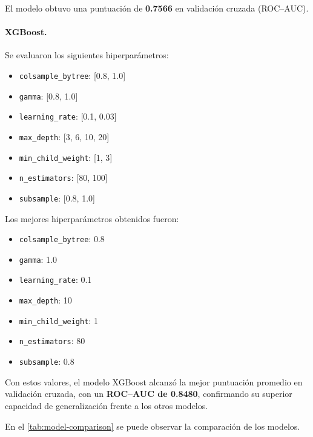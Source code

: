 \documentclass[12pt]{article}
\begin{document}
El modelo obtuvo una puntuación de \textbf{0.7566} en validación cruzada (ROC–AUC).

\paragraph{XGBoost.}
Se evaluaron los siguientes hiperparámetros:

\begin{itemize}
    \item \texttt{colsample\_bytree}: [0.8, 1.0]
    \item \texttt{gamma}: [0.8, 1.0]
    \item \texttt{learning\_rate}: [0.1, 0.03]
    \item \texttt{max\_depth}: [3, 6, 10, 20]
    \item \texttt{min\_child\_weight}: [1, 3]
    \item \texttt{n\_estimators}: [80, 100]
    \item \texttt{subsample}: [0.8, 1.0]
\end{itemize}

Los mejores hiperparámetros obtenidos fueron:

\begin{itemize}
    \item \texttt{colsample\_bytree}: 0.8
    \item \texttt{gamma}: 1.0
    \item \texttt{learning\_rate}: 0.1
    \item \texttt{max\_depth}: 10
    \item \texttt{min\_child\_weight}: 1
    \item \texttt{n\_estimators}: 80
    \item \texttt{subsample}: 0.8
\end{itemize}

Con estos valores, el modelo XGBoost alcanzó la mejor puntuación promedio en validación cruzada, con un \textbf{ROC–AUC de 0.8480}, confirmando su superior capacidad de generalización frente a los otros modelos.

En el \cref{tab:model-comparison} se puede observar la comparación de los modelos.
\end{document}
